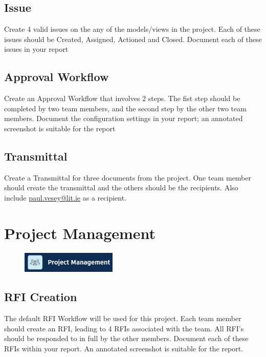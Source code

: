 \subsection{Issue}

Create 4 valid issues on the any of the models/views in the project.  Each of these issues should be Created, Assigned, Actioned and Closed.  Document each of these issues in your report

\subsection{Approval Workflow}

Create an Approval Workflow that involves 2 steps.  The fist step should be completed by two team members, and the second step by the other two team members.  Document the configuration settings in your report; an annotated screenshot is suitable for the report

\subsection{Transmittal}

Create a Transmittal for three documents from the project.  One team member should create the transmittal and the others should be the recipients.  Also include \href{mailto:paul.vesey@lit.ie}{paul.vesey@lit.ie} as a recipient.  


\section{Project Management}

\begin{figure}[h!t]
	\includegraphics[height=1.0cm]{RevitAssets/projmgmt}
	\label{fig:projmgmt}
\end{figure}



\subsection{RFI Creation}
The default RFI Workflow will be used for this project.  Each team member should create an RFI, leading to 4 RFIs associated with the team.  All RFI's should be responded to in full by the other members.  Document each of these RFIs within your report. An annotated screenshot is suitable for the report. 



